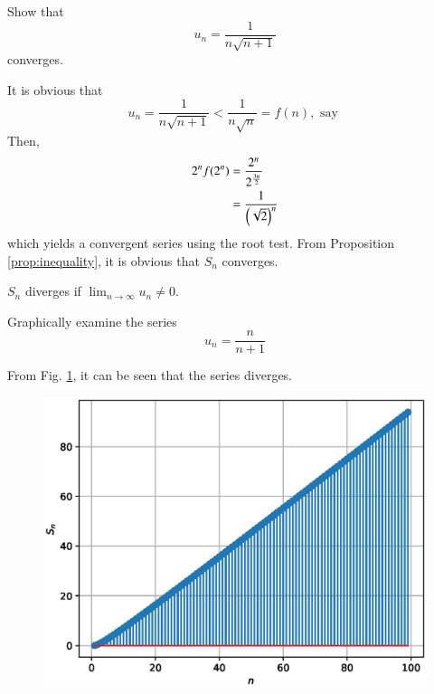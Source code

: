 \documentclass[journal,12pt,twocolumn]{IEEEtran}
\begin{document}
%
\begin{problem}
Show that 
\begin{equation}
u_{n}=\frac{1}{n\sqrt{n+1}}
\end{equation}
converges.
\end{problem}
\solution It is obvious that
\begin{equation}
u_n =\frac{1}{n\sqrt{n+1}} < \frac{1}{n\sqrt{n}} = f(n), \text{ say }
\end{equation}
Then,
\begin{align}
2^nf(2^n)&= \frac{2^n}{2^{\frac{3n}{2}}}
\\
&= \frac{1}{\left(\sqrt{2}\right)^n}
\end{align}
which yields a convergent series using the root test. From Proposition \ref{prop:inequality}, it is obvious that $S_n$ converges.
\begin{proposition}
\label{prop:nonzero}
$S_n$ diverges if $\lim_{n\rightarrow \infty}u_n \ne 0$.
\end{proposition}
\begin{problem}
Graphically examine the series 
\begin{equation}
u_n = \frac{n}{n+1}
\end{equation}
\end{problem}
\solution From Fig. \ref{fig:4}, it can be seen that the series diverges.
%

%
\begin{figure}[!ht]
\begin{center}
\includegraphics[width=\columnwidth]{./figs/4.eps}
\end{center}
\label{fig:4}	
\end{figure}
\end{document}

